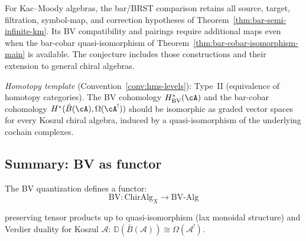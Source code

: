 \begin{remark}[Scope]
For Kac--Moody algebras, the bar/BRST comparison retains all source, target, filtration, symbol-map, and correction hypotheses of Theorem~\ref{thm:bar-semi-infinite-km}.
Its BV compatibility and pairings require additional maps even when the bar-cobar quasi-isomorphism of Theorem~\ref{thm:bar-cobar-isomorphism-main} is available.
The conjecture includes those constructions and their extension to general chiral algebras.

\emph{Homotopy template} (Convention~\ref{conv:hms-levels}): Type~II (equivalence of homotopy categories).
The BV cohomology $H^*_{\mathrm{BV}}(\cA)$ and the bar-cobar cohomology $H^*(\bar{B}(\cA), \Omega(\cA^!))$ should be isomorphic as graded vector spaces for every Koszul chiral algebra, induced by a quasi-isomorphism of the underlying cochain complexes.
\end{remark}

\subsection{Summary: BV as functor}

\begin{theorem}
\label{thm:bv-functor}
The BV quantization defines a functor:
\[\mathrm{BV}: \mathrm{ChirAlg}_X \longrightarrow \mathrm{BV\text{-}Alg}\]

preserving tensor products up to quasi-isomorphism (lax monoidal structure) and Verdier duality for Koszul $\mathcal{A}$: $\mathbb{D}(\bar{B}(\mathcal{A})) \cong \Omega(\mathcal{A}^!)$.
\end{theorem}

